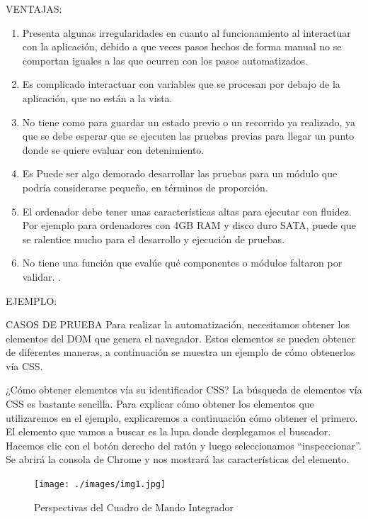 \documentclass[letterpaper, 12pt, spanish]{article}
\begin{document}
VENTAJAS:
\begin{enumerate} %
	\item \textbf{}Presenta algunas irregularidades en cuanto al funcionamiento al interactuar con la aplicación, debido a que veces pasos hechos de forma manual no se comportan iguales a las que ocurren con los pasos automatizados.
	
	\item \textbf{}Es complicado interactuar con variables que se procesan por debajo de la aplicación, que no están a la vista.
	\item \textbf{}No tiene como para guardar un estado previo o un recorrido ya realizado, ya que se debe esperar que se ejecuten las pruebas previas para llegar un punto donde se quiere evaluar con detenimiento.
		\item \textbf{}Es Puede ser algo demorado desarrollar las pruebas para un módulo que podría considerarse pequeño, en términos de proporción.
			\item \textbf{}El ordenador debe tener unas características altas para ejecutar con fluidez. Por ejemplo para ordenadores con 4GB RAM y disco duro SATA, puede que se ralentice mucho para el desarrollo y ejecución de pruebas.
	\item \textbf{}No tiene una función que evalúe qué componentes o módulos faltaron por validar. \cite{marr2015}.
\end{enumerate}

EJEMPLO:

CASOS DE PRUEBA
Para realizar la automatización, necesitamos obtener los elementos del DOM que genera el navegador. Estos elementos se pueden obtener de diferentes maneras, a continuación se muestra un ejemplo de cómo obtenerlos vía CSS.

¿Cómo obtener elementos vía su identificador CSS?
La búsqueda de elementos vía CSS es bastante sencilla. Para explicar cómo obtener los elementos que utilizaremos en el ejemplo, explicaremos a continuación cómo obtener el primero.
El elemento que vamos a buscar es la lupa donde desplegamos el buscador.
Hacemos clic con el botón derecho del ratón y luego seleccionamos “inspeccionar”. Se abrirá la consola de Chrome y nos mostrará las características del elemento.

\begin{figure}[H]
	\begin{center}
		\texttt{[image: ./images/img1.jpg]}
		\caption{Perspectivas del Cuadro de Mando Integrador}
	\end{center}
\end{figure}
\end{document}

